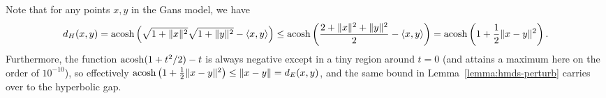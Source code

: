 Note that for any points $x,y$ in the Gans model, we have
\[
  d_H(x,y) = \operatorname{acosh}\left( \sqrt{1 + \|x\|^2}\sqrt{1 + \|y\|^2} - \langle x,y \rangle \right) \le \operatorname{acosh}\left( \frac{2 + \|x\|^2 + \|y\|^2}{2} - \langle x,y \rangle \right) = \operatorname{acosh}\left( 1 + \frac{1}{2}\|x-y\|^2 \right).
\]
Furthermore, the function $\operatorname{acosh}(1 + t^2/2) - t$ is always negative except in a tiny region around $t=0$ (and attains a maximum here on the order of $10^{-10}$),
so effectively $\operatorname{acosh}\left( 1 + \frac{1}{2}\|x-y\|^2 \right) \le \|x-y\| = d_E(x,y)$,
and the same bound in Lemma~\ref{lemma:hmds-perturb} carries over to the hyperbolic gap.


